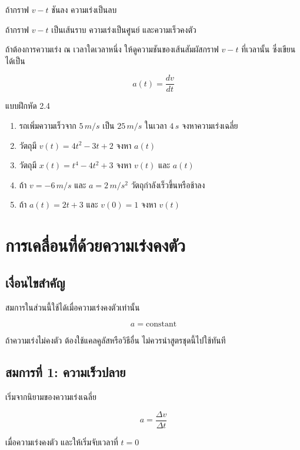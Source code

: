 ถ้ากราฟ $v-t$ ชันลง ความเร่งเป็นลบ

ถ้ากราฟ $v-t$ เป็นเส้นราบ ความเร่งเป็นศูนย์ และความเร็วคงตัว

\begin{tcolorbox}[title=เชื่อมกับแคลคูลัส]
ถ้าต้องการความเร่ง ณ เวลาใดเวลาหนึ่ง ให้ดูความชันของเส้นสัมผัสกราฟ $v-t$ ที่เวลานั้น ซึ่งเขียนได้เป็น

\[
a(t)=\frac{dv}{dt}
\]
\end{tcolorbox}

\begin{exercisebox}{แบบฝึกหัด 2.4}
\begin{enumerate}
    \item รถเพิ่มความเร็วจาก $5\,\si{m/s}$ เป็น $25\,\si{m/s}$ ในเวลา $4\,\si{s}$ จงหาความเร่งเฉลี่ย
    \item วัตถุมี $v(t)=4t^2-3t+2$ จงหา $a(t)$
    \item วัตถุมี $x(t)=t^4-4t^2+3$ จงหา $v(t)$ และ $a(t)$
    \item ถ้า $v=-6\,\si{m/s}$ และ $a=2\,\si{m/s^2}$ วัตถุกำลังเร็วขึ้นหรือช้าลง
    \item ถ้า $a(t)=2t+3$ และ $v(0)=1$ จงหา $v(t)$
\end{enumerate}
\end{exercisebox}

\section{การเคลื่อนที่ด้วยความเร่งคงตัว}

\subsection{เงื่อนไขสำคัญ}

สมการในส่วนนี้ใช้ได้เมื่อความเร่งคงตัวเท่านั้น

\[
a=\text{constant}
\]

ถ้าความเร่งไม่คงตัว ต้องใช้แคลคูลัสหรือวิธีอื่น ไม่ควรนำสูตรชุดนี้ไปใช้ทันที

\subsection{สมการที่ 1: ความเร็วปลาย}

เริ่มจากนิยามของความเร่งเฉลี่ย

\[
a=\frac{\Delta v}{\Delta t}
\]

เมื่อความเร่งคงตัว และให้เริ่มจับเวลาที่ $t=0$

